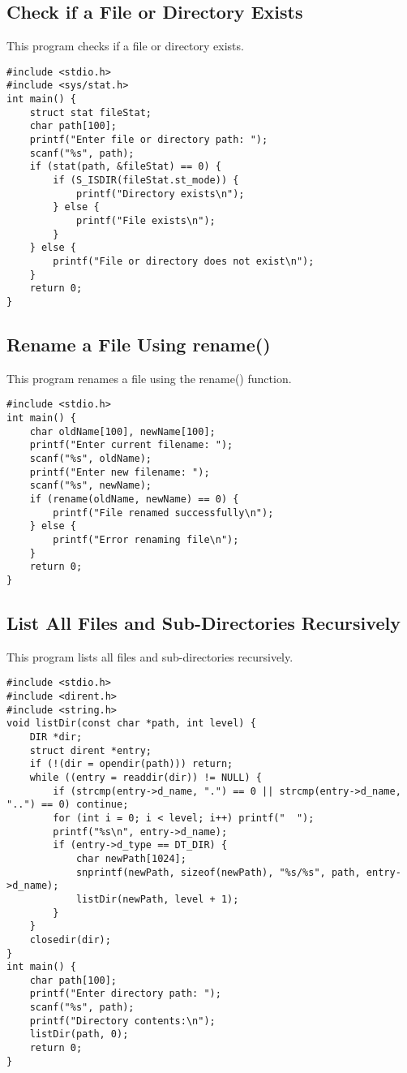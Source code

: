 \documentclass[a4paper,12pt]{article}
\begin{document}
\subsection{Check if a File or Directory Exists}
This program checks if a file or directory exists.
\begin{lstlisting}[caption={Check if a File or Directory Exists}]
#include <stdio.h>
#include <sys/stat.h>
int main() {
    struct stat fileStat;
    char path[100];
    printf("Enter file or directory path: ");
    scanf("%s", path);
    if (stat(path, &fileStat) == 0) {
        if (S_ISDIR(fileStat.st_mode)) {
            printf("Directory exists\n");
        } else {
            printf("File exists\n");
        }
    } else {
        printf("File or directory does not exist\n");
    }
    return 0;
}
\end{lstlisting}
\clearpage

\subsection{Rename a File Using rename()}
This program renames a file using the rename() function.
\begin{lstlisting}[caption={Rename a File Using rename()}]
#include <stdio.h>
int main() {
    char oldName[100], newName[100];
    printf("Enter current filename: ");
    scanf("%s", oldName);
    printf("Enter new filename: ");
    scanf("%s", newName);
    if (rename(oldName, newName) == 0) {
        printf("File renamed successfully\n");
    } else {
        printf("Error renaming file\n");
    }
    return 0;
}
\end{lstlisting}
\clearpage

\subsection{List All Files and Sub-Directories Recursively}
This program lists all files and sub-directories recursively.
\begin{lstlisting}[caption={List All Files and Sub-Directories Recursively}]
#include <stdio.h>
#include <dirent.h>
#include <string.h>
void listDir(const char *path, int level) {
    DIR *dir;
    struct dirent *entry;
    if (!(dir = opendir(path))) return;
    while ((entry = readdir(dir)) != NULL) {
        if (strcmp(entry->d_name, ".") == 0 || strcmp(entry->d_name, "..") == 0) continue;
        for (int i = 0; i < level; i++) printf("  ");
        printf("%s\n", entry->d_name);
        if (entry->d_type == DT_DIR) {
            char newPath[1024];
            snprintf(newPath, sizeof(newPath), "%s/%s", path, entry->d_name);
            listDir(newPath, level + 1);
        }
    }
    closedir(dir);
}
int main() {
    char path[100];
    printf("Enter directory path: ");
    scanf("%s", path);
    printf("Directory contents:\n");
    listDir(path, 0);
    return 0;
}
\end{lstlisting}
\clearpage
\end{document}
